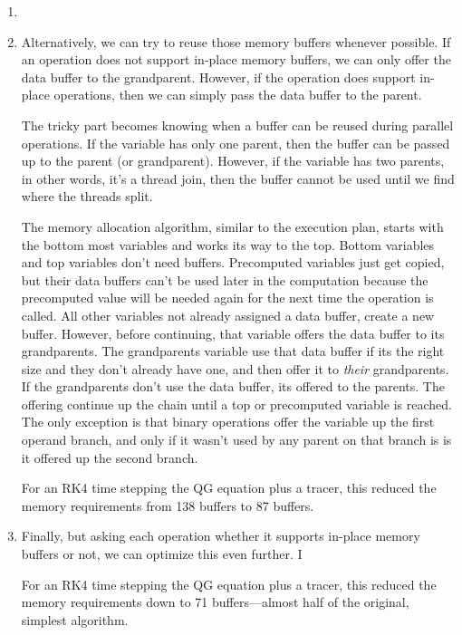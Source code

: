 \documentclass[11pt]{article}
\begin{document}
\begin{enumerate}

\item 

\item Alternatively, we can try to reuse those memory buffers whenever possible. If an operation does not support in-place memory buffers, we can only offer the data buffer to the grandparent. However, if the operation does support in-place operations, then we can simply pass the data buffer to the parent.

The tricky part becomes knowing when a buffer can be reused during parallel operations. If the variable has only one parent, then the buffer can be passed up to the parent (or grandparent). However, if the variable has two parents, in other words, it's a thread join, then the buffer cannot be used until we find where the threads split.

The memory allocation algorithm, similar to the execution plan, starts with the bottom most variables and works its way to the top. Bottom variables and top variables don't need buffers. Precomputed variables just get copied, but their data buffers can't be used later in the computation because the precomputed value will be needed again for the next time the operation is called. All other variables not already assigned a data buffer, create a new buffer. However, before continuing, that variable offers the data buffer to its grandparents. The grandparents variable use that data buffer if its the right size and they don't already have one, and then offer it to \emph{their} grandparents. If the grandparents don't use the data buffer, its offered to the parents. The offering continue up the chain until a top or precomputed variable is reached. The only exception is that binary operations offer the variable up the first operand branch, and only if it wasn't used by any parent on that branch is is it offered up the second branch.

For an RK4 time stepping the QG equation plus a tracer, this reduced the memory requirements from 138 buffers to 87 buffers.

\item Finally, but asking each operation whether it supports in-place memory buffers or not, we can optimize this even further. I

For an RK4 time stepping the QG equation plus a tracer, this reduced the memory requirements down to 71 buffers---almost half of the original, simplest algorithm.

\end{enumerate}
\end{document}
